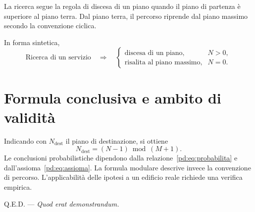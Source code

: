 La ricerca segue la regola di discesa di un piano quando il piano di partenza è superiore al piano terra. Dal piano terra, il percorso riprende dal piano massimo secondo la convenzione ciclica.
\par\normalfont\medskip
In forma sintetica,
\[
\text{Ricerca di un servizio}
\quad\Longrightarrow\quad
\begin{cases}
\text{discesa di un piano}, & N>0,\\[4pt]
\text{risalita al piano massimo}, & N=0.
\end{cases}
\]

\section{Formula conclusiva e ambito di validità}
Indicando con $N_{\mathrm{dest}}$ il piano di destinazione, si ottiene
\[
\boxed{N_{\mathrm{dest}}=(N-1)\bmod(M+1).}
\]
Le conclusioni probabilistiche dipendono dalla relazione~\eqref{pd:eq:probabilita} e dall'assioma~\eqref{pd:eq:assioma}. La formula modulare descrive invece la convenzione di percorso. L'applicabilità delle ipotesi a un edificio reale richiede una verifica empirica.

\begin{flushright}
\textsc{Q.E.D.} --- \textit{Quod erat demonstrandum.}
\end{flushright}
